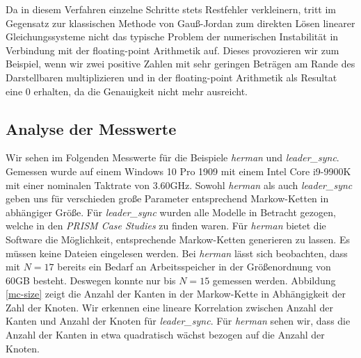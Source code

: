 \documentclass[a4paper]{article}
\newcommand{\mc}{Markow-Kette}
\theoremstyle{nonumberplain}
\begin{document}
Da in diesem Verfahren einzelne Schritte stets Restfehler verkleinern, tritt im Gegensatz zur klassischen Methode von Gauß-Jordan zum direkten Lösen linearer Gleichungssysteme nicht das typische Problem der numerischen Instabilität in Verbindung mit der floating-point Arithmetik auf. Dieses provozieren wir zum Beispiel, wenn wir zwei positive Zahlen mit sehr geringen Beträgen am Rande des Darstellbaren multiplizieren und in der floating-point Arithmetik als Resultat eine $0$ erhalten, da die Genauigkeit nicht mehr ausreicht.

\subsection{Analyse der Messwerte}


Wir sehen im Folgenden Messwerte für die Beispiele \textit{herman} und \textit{leader\_sync}. Gemessen wurde auf einem Windows 10 Pro 1909 mit einem Intel Core i9-9900K mit einer nominalen Taktrate von 3.60GHz.
Sowohl \textit{herman} als auch \textit{leader\_sync} geben uns für verschieden große Parameter entsprechend \mc{}n in abhängiger Größe. Für \textit{leader\_sync} wurden alle Modelle in Betracht gezogen, welche in den \textit{PRISM Case Studies} \cite{PRISMCS} zu finden waren. Für \textit{herman} bietet die Software die Möglichkeit, entsprechende \mc{}n generieren zu lassen. Es müssen keine Dateien eingelesen werden. Bei \textit{herman} lässt sich beobachten, dass mit $N=17$ bereits ein Bedarf an Arbeitsspeicher in der Größenordnung von 60GB besteht. Deswegen konnte nur bis $N=15$ gemessen werden. Abbildung \ref{mc-size} zeigt die Anzahl der Kanten in der \mc{} in Abhängigkeit der Zahl der Knoten. Wir erkennen eine lineare Korrelation zwischen Anzahl der Kanten und Anzahl der Knoten für \textit{leader\_sync}. Für \textit{herman} sehen wir, dass die Anzahl der Kanten in etwa quadratisch wächst bezogen auf die Anzahl der Knoten.
\end{document}
